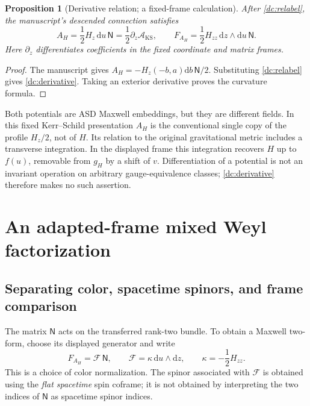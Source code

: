 \documentclass[11pt]{article}
\numberwithin{equation}{section}
\newtheorem{proposition}{Proposition}[section]
\theoremstyle{remark}
\newcommand{\dd}{\mathrm d}
\newcommand{\NN}{\mathsf N}
\begin{document}
\begin{proposition}[Derivative relation; a fixed-frame calculation]
After \eqref{dc:relabel}, the manuscript's descended connection satisfies
\begin{equation}\label{dc:derivative}
 A_H=\frac12 H_z\,\dd u\,\NN
     =\frac12\partial_z\mathcal A_{\mathrm{KS}},
 \qquad
 F_{A_H}=\frac12 H_{zz}\,\dd z\wedge\dd u\,\NN.
\end{equation}
Here $\partial_z$ differentiates coefficients in the fixed coordinate and
matrix frames.
\end{proposition}
\begin{proof}
The manuscript gives
$A_H=-H_z(-b,a)\dd b\,\NN/2$.
Substituting \eqref{dc:relabel} gives \eqref{dc:derivative}.
Taking an exterior derivative proves the curvature formula.
\end{proof}

Both potentials are ASD Maxwell embeddings, but they are different fields.
In this fixed Kerr--Schild presentation $A_H$ is the conventional single
copy of the profile $H_z/2$, not of $H$. Its relation to the original
gravitational metric includes a transverse integration. In the displayed
frame this integration recovers $H$ up to $f(u)$, removable from $g_H$ by
a shift of $v$. Differentiation of a potential is not an invariant
operation on arbitrary gauge-equivalence classes; \eqref{dc:derivative}
therefore makes no such assertion.

\section{An adapted-frame mixed Weyl factorization}

\subsection{Separating color, spacetime spinors, and frame comparison}

The matrix $\NN$ acts on the transferred rank-two bundle. To obtain a
Maxwell two-form, choose its displayed generator and write
\begin{equation}\label{dc:strip}
 F_{A_H}=\mathcal F\,\NN,
 \qquad
 \mathcal F=\kappa\,\dd u\wedge\dd z,
 \qquad
 \kappa=-\frac12H_{zz}.
\end{equation}
This is a choice of color normalization. The spinor associated with
$\mathcal F$ is obtained using the \emph{flat spacetime} spin coframe; it
is not obtained by interpreting the two indices of $\NN$ as spacetime
spinor indices.
\end{document}
